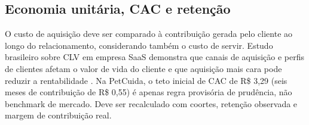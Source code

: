 \subsection{Economia unitária, CAC e retenção}
O custo de aquisição deve ser comparado à contribuição gerada pelo cliente ao longo do relacionamento, considerando também o custo de servir. Estudo brasileiro sobre CLV em empresa SaaS demonstra que canais de aquisição e perfis de clientes afetam o valor de vida do cliente e que aquisição mais cara pode reduzir a rentabilidade \cite{kock2024}. Na PetCuida, o teto inicial de CAC de R\$ 3,29 (seis meses de contribuição de R\$ 0,55) é apenas regra provisória de prudência, não benchmark de mercado. Deve ser recalculado com coortes, retenção observada e margem de contribuição real.
